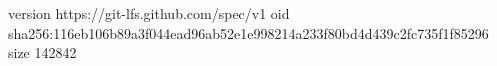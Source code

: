 version https://git-lfs.github.com/spec/v1
oid sha256:116eb106b89a3f044ead96ab52e1e998214a233f80bd4d439c2fc735f1f85296
size 142842

